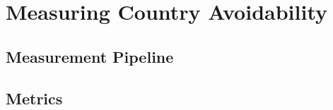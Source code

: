 \section{Measuring Country Avoidability}

\subsection{Measurement Pipeline}

\subsection{Metrics}


